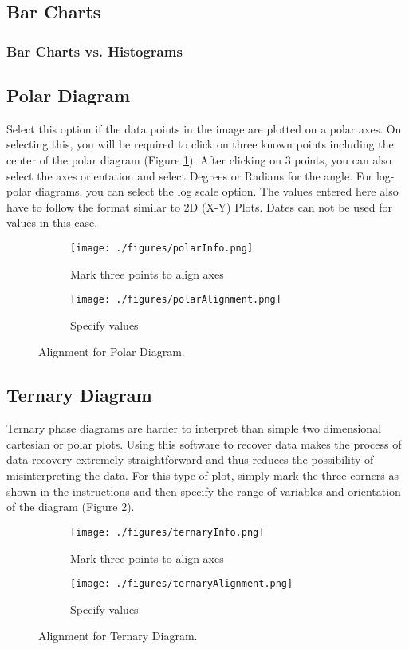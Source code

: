 \documentclass[letterpaper, 10pt]{article}
\begin{document}
\subsection{Bar Charts}

\subsubsection{Bar Charts vs. Histograms}

\subsection{Polar Diagram}
Select this option if the data points in the image are plotted on a polar axes. On selecting this, you will be required to click on three known points including the center of the polar diagram (Figure \ref{fig:polarAlignment}). After clicking on 3 points, you can also select the axes orientation and select Degrees or Radians for the angle. For log-polar diagrams, you can select the log scale option. The values entered here also have to follow the format similar to 2D (X-Y) Plots. Dates can not be used for values in this case.

\begin{figure}
\centering
{\begin{subfigure}[b]{0.4\textwidth}
\texttt{[image: ./figures/polarInfo.png]}
\caption{Mark three points to align axes}
\end{subfigure}
\begin{subfigure}[b]{0.3\textwidth}
\texttt{[image: ./figures/polarAlignment.png]}
\caption{Specify values}
\end{subfigure}}
\caption{Alignment for Polar Diagram.}
\label{fig:polarAlignment}
\end{figure}
 
\subsection{Ternary Diagram}
Ternary phase diagrams are harder to interpret than simple two dimensional cartesian or polar plots. Using this software to recover data makes the process of data recovery extremely straightforward and thus reduces the possibility of misinterpreting the data. For this type of plot, simply mark the three corners as shown in the instructions and then specify the range of variables and orientation of the diagram (Figure \ref{fig:ternaryAlignment}).

\begin{figure}
\centering
{\begin{subfigure}[b]{0.4\textwidth}
\texttt{[image: ./figures/ternaryInfo.png]}
\caption{Mark three points to align axes}
\end{subfigure}
\begin{subfigure}[b]{0.4\textwidth}
\texttt{[image: ./figures/ternaryAlignment.png]}
\caption{Specify values}
\end{subfigure}}
\caption{Alignment for Ternary Diagram.}
\label{fig:ternaryAlignment}
\end{figure}
\end{document}
